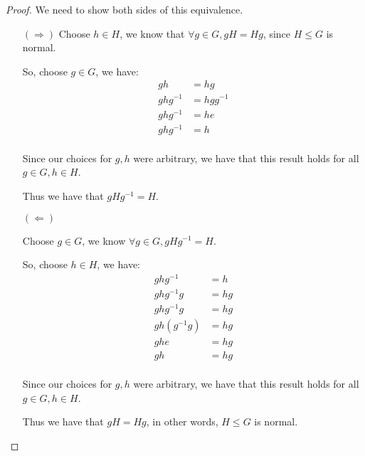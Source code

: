 \documentclass[12pt,letterpaper]{article}
\newcommand{\ghg}[1]{g#1g^{-1}}
\begin{document}
\begin{enumerate}
\begin{enumerate}
\begin{proof}
            We need to show both sides of this equivalence.

            \begin{itemize}
              \item[$(\Rightarrow)$]
                Choose $h \in H$, we know that $\forall g \in G, gH = Hg$, since $H \le G$ is normal.

                So, choose $g \in G$, we have:
                \begin{align*}
                  gh &= hg \\
                  ghg^{-1} &= hgg^{-1} \\
                  ghg^{-1} &= he \\
                  ghg^{-1} &= h \\
                \end{align*}

                Since our choices for $g, h$ were arbitrary, we have that this result holds for all $g \in G, h \in H$.

                Thus we have that $\ghg{H} = H$.

              \item[$(\Leftarrow)$]

                Choose $g \in G$, we know $\forall g \in G, \ghg{H} = H$.

                So, choose $h \in H$, we have:
                \begin{align*}
                  \ghg{h} &= h \\
                  \ghg{h}g &= hg \\
                  \ghg{h}g &= hg \\
                  gh(g^{-1}g) &= hg \\
                  ghe &= hg \\
                  gh &= hg \\
                \end{align*}

                Since our choices for $g, h$ were arbitrary, we have that this result holds for all $g \in G, h \in H$.

                Thus we have that $gH = Hg$, in other words, $H \le G$ is normal.
            \end{itemize}
          \end{proof}
      \end{enumerate}
  \end{enumerate}
\end{document}
